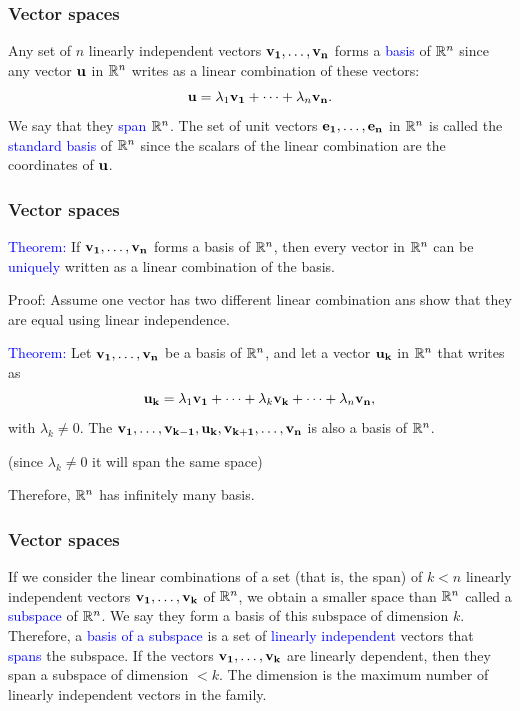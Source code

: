 \documentclass[11pt,aspectratio=169]{beamer}
\begin{document}
\begin{frame}
\frametitle{Vector spaces}
\begin{small}
Any set of $n$ linearly independent vectors $\bf{v}_1,\dots, \bf{v}_n$ forms a \textcolor{blue}{basis} of $\mathbb R^n$ since any vector $\bf{u}$ in $\mathbb R^n$ writes as a linear combination of these vectors:
$$
{\bf u}=\lambda_1 {\bf v_1}+\cdots+\lambda_n {\bf v_n}. 
$$
We  say that they \textcolor{blue}{span} $\mathbb R^n$.
\vskip 12pt
The set of unit vectors $\bf{e}_1, \dots, \bf{e}_n$ in $\mathbb R^n$ is called the \textcolor{blue}{standard basis} of $\mathbb R^n$ since the scalars of the linear combination are the coordinates of $\bf{u}$.


\end{small}
\end{frame}

\begin{frame}
\frametitle{Vector spaces}
\begin{small}



\textcolor{blue}{Theorem:} If $\bf{v}_1,\dots, \bf{v}_n$ forms a basis of $\mathbb R^n$, then every vector in $\mathbb R^n$ 
can be \textcolor{blue}{uniquely} written as a linear combination of the basis. 

\begin{tiny}Proof: Assume one vector has two different linear combination ans show that they are equal using linear independence.\end{tiny}
\vskip 12pt
\textcolor{blue}{Theorem:} Let $\bf{v}_1,\dots, \bf{v}_n$ be a basis of $\mathbb R^n$, and let a vector  $\bf{u}_k$ in $\mathbb R^n$ that writes as
$$
{\bf u_k}= \lambda_1{\bf v_1}+\cdots+\lambda_k{\bf v_k}+\cdots +\lambda_n {\bf v_n},
$$
with $\lambda_k \neq 0$. The $\bf{v}_1,\dots,\bf{v}_{k-1}, \bf{u}_k, \bf{v}_{k+1}, \dots,\bf{v}_n$ is also a basis of $\mathbb R^n$. \begin{tiny}(since $\lambda_k \neq 0$ it will span the same space) \end{tiny}
\vskip 12pt
Therefore, $\mathbb R^n$ has infinitely many basis.


\end{small}
\end{frame}




\begin{frame}
\frametitle{Vector spaces}
\begin{small}
If we consider the  linear combinations of a set (that is, the span) of $k<n$ linearly independent vectors $\bf{v}_1,\dots, \bf{v}_k$ of $\mathbb R^n$, we obtain a smaller space than $\mathbb R^n$ called a \textcolor{blue}{subspace} of $\mathbb R^n$. We say they form a basis of this subspace of dimension $k$.
\vskip 12pt
Therefore, a \textcolor{blue}{basis of a subspace} is a set  of \textcolor{blue}{linearly independent} vectors that \textcolor{blue}{spans}  the subspace.
\vskip 12pt
If the  vectors $\bf{v}_1,\dots, \bf{v}_k$ are linearly dependent, then they span a subspace of dimension $<k$. The dimension is the maximum number of linearly independent vectors in the family.


\end{small}
\end{frame}
\end{document}
